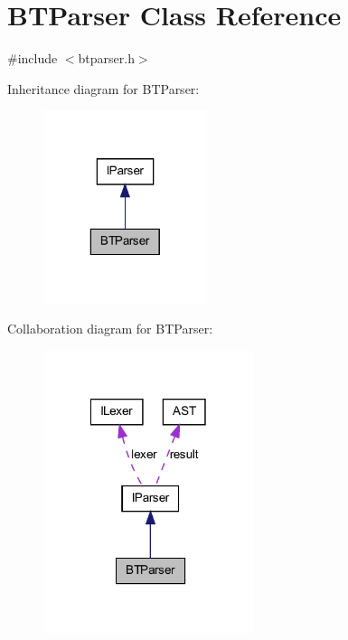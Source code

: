 \hypertarget{class_b_t_parser}{
\section{BTParser Class Reference}
\label{class_b_t_parser}
}


{\ttfamily \#include $<$btparser.h$>$}



Inheritance diagram for BTParser:
\nopagebreak
\begin{figure}[H]
\begin{center}
\leavevmode
\includegraphics[width=136pt]{class_b_t_parser__inherit__graph}
\end{center}
\end{figure}


Collaboration diagram for BTParser:
\nopagebreak
\begin{figure}[H]
\begin{center}
\leavevmode
\includegraphics[width=174pt]{class_b_t_parser__coll__graph}
\end{center}
\end{figure}
